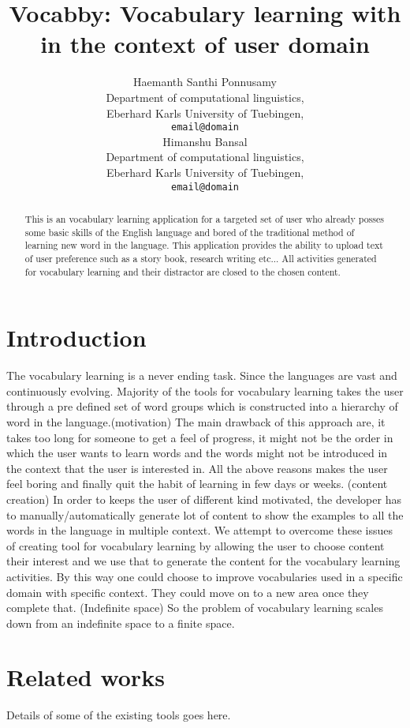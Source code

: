 \documentclass[11pt,a4paper]{article}
\title{Vocabby: Vocabulary learning with in the context of user domain}
\author{Haemanth Santhi Ponnusamy \\
  Department of computational linguistics, \\
  Eberhard Karls University of Tuebingen,\\
  {\tt email@domain} \\\And
  Himanshu Bansal \\
  Department of computational linguistics, \\
  Eberhard Karls University of Tuebingen,\\
  {\tt email@domain} \\}
\date{}
\begin{document}
\maketitle
\begin{abstract}
  This is an vocabulary learning application for a targeted set of user
  who already posses some basic skills of the English language and
  bored of the traditional method of learning new word in the language. This
  application provides the ability to upload text of user preference
  such as a story book, research writing etc... All activities generated for
  vocabulary learning and their distractor are closed to the chosen content.
\end{abstract}

\section{Introduction}
The vocabulary learning is a never ending task. Since the languages are vast
and continuously evolving. Majority of the tools for vocabulary learning takes
the user through a pre defined set of word groups which is constructed into a
hierarchy of word in the language.(motivation) The main drawback of this approach are, it
takes too long for someone to get a feel of progress, it might not be the
order in which the user wants to learn words and the words might not be
introduced in the context that the user is interested in. All the above reasons
makes the user feel boring and finally quit the habit of learning in few days
or weeks. (content creation) In order to keeps the user of different kind
motivated, the developer has to manually/automatically generate lot of content
to show the examples to all the words in the language in multiple context.
We attempt to overcome these issues of creating tool for vocabulary learning
by allowing the user to choose content their interest and we use that to
generate the content for the vocabulary learning activities. By this way one
could choose to improve vocabularies used in a specific domain with specific
context. They could move on to a new area once they complete that.
(Indefinite space) So the problem of vocabulary learning scales down from an
indefinite space to a finite space.

\section{Related works}
Details of some of the existing tools goes here.
\end{document}
